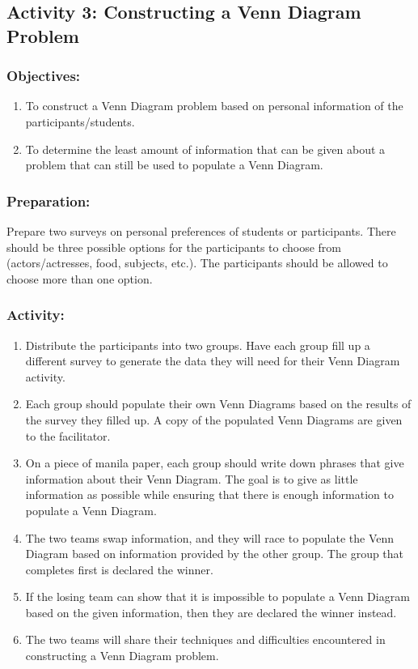 \subsection*{Activity 3:	Constructing a Venn Diagram Problem}
\subsubsection*{Objectives:}
\begin{enumerate}
\item To construct a Venn Diagram problem based on personal information of the participants/students. 
\item To determine the least amount of information that can be given about a problem that can still be used to populate a Venn Diagram.
\end{enumerate}
\subsubsection*{Preparation:}
Prepare two surveys on personal preferences of students or participants. There should be three possible options for the participants to choose from (actors/actresses, food, subjects, etc.). The participants should be allowed to choose more than one option.
\subsubsection*{Activity:}
\begin{enumerate}
\item Distribute the participants into two groups. Have each group fill up a different survey to generate the data they will need for their Venn Diagram activity.
\item Each group should populate their own Venn Diagrams based on the results of the survey they filled up. A copy of the populated Venn Diagrams are given to the facilitator.
\item On a piece of manila paper, each group should write down phrases that give information about their Venn Diagram. The goal is to give as little information as possible while ensuring that there is enough information to populate a Venn Diagram.
\item The two teams swap information, and they will race to populate the Venn Diagram based on information provided by the other group. The group that completes first is declared the winner.
\item If the losing team can show that it is impossible to populate a Venn Diagram based on the given information, then they are declared the winner instead.
\item The two teams will share their techniques and difficulties encountered in constructing a Venn Diagram problem.
\end{enumerate}

